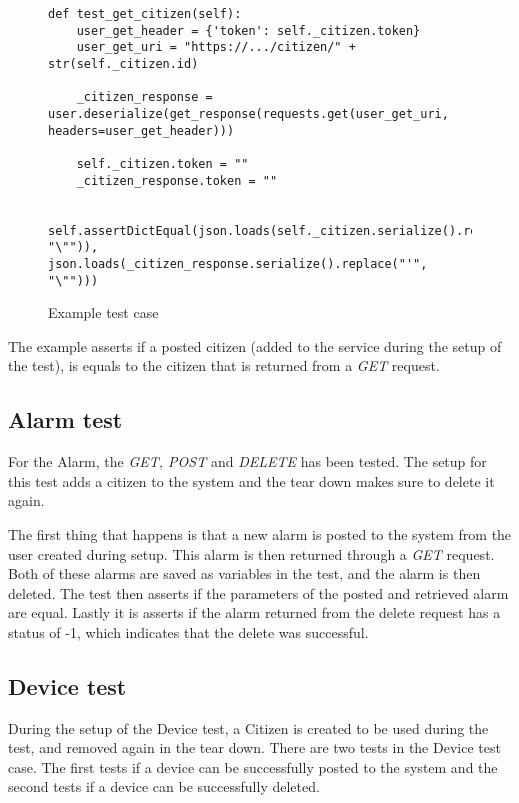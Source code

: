 \begin{figure}[H]
    \centering
    \begin{lstlisting}[language=pyt]
def test_get_citizen(self):
    user_get_header = {'token': self._citizen.token}
    user_get_uri = "https://.../citizen/" + str(self._citizen.id)

    _citizen_response = user.deserialize(get_response(requests.get(user_get_uri, headers=user_get_header)))

    self._citizen.token = ""
    _citizen_response.token = ""

    self.assertDictEqual(json.loads(self._citizen.serialize().replace("'", "\"")), json.loads(_citizen_response.serialize().replace("'", "\"")))
        \end{lstlisting}
    \caption{Example test case}
    \label{fig:test-api-example}
\end{figure}

The example asserts if a posted citizen (added to the service during the setup of the test), is equals to the citizen that is returned from a \textit{GET} request.


\subsection{Alarm test}
For the Alarm, the \textit{GET, POST} and \textit{DELETE} has been tested. The setup for this test adds a citizen to the system and the tear down makes sure to delete it again.

The first thing that happens is that a new alarm is posted to the system from the user created during setup. This alarm is then returned through a \textit{GET} request. Both of these alarms are saved as variables in the test, and the alarm is then deleted. The test then asserts if the parameters of the posted and retrieved alarm are equal. Lastly it is asserts if the alarm returned from the delete request has a status of -1, which indicates that the delete was successful.

\subsection{Device test}
During the setup of the Device test, a Citizen is created to be used during the test, and removed again in the tear down. There are two tests in the Device test case. The first tests if a device can be successfully posted to the system and the second tests if a device can be successfully deleted.

